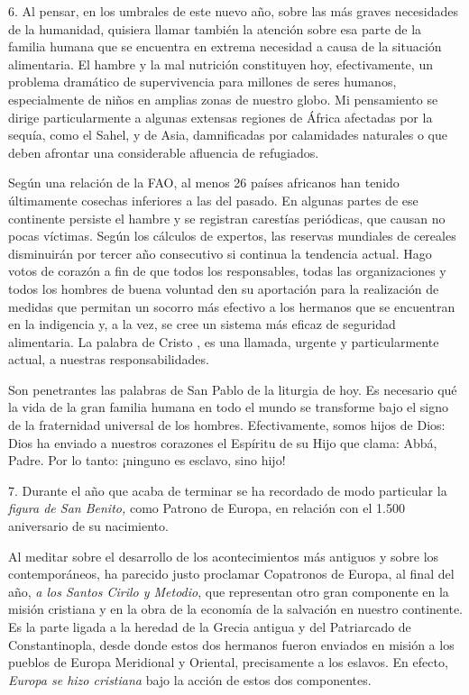 \begin{body}
\begin{body}
6. Al pensar, en los umbrales de este nuevo año, sobre las más graves necesidades de la humanidad, quisiera llamar también la atención sobre esa parte de la familia humana que se encuentra en extrema necesidad a causa de la situación alimentaria. El hambre y la mal nutrición constituyen hoy, efectivamente, un problema dramático de supervivencia para millones de seres humanos, especialmente de niños en amplias zonas de nuestro globo. Mi pensamiento se dirige particularmente a algunas extensas regiones de África afectadas por la sequía, como el Sahel, y de Asia, damnificadas por calamidades naturales o que deben afrontar una considerable afluencia de refugiados.

Según una relación de la FAO, al menos 26 países africanos han tenido últimamente cosechas inferiores a las del pasado. En algunas partes de ese continente persiste el hambre y se registran carestías periódicas, que causan no pocas víctimas. Según los cálculos de expertos, las reservas mundiales de cereales disminuirán por tercer año consecutivo si continua la tendencia actual. Hago votos de corazón a fin de que todos los responsables, todas las organizaciones y todos los hombres de buena voluntad den su aportación para la realización de medidas que permitan un socorro más efectivo a los hermanos que se encuentran en la indigencia y, a la vez, se cree un sistema más eficaz de seguridad alimentaria. La palabra de Cristo , es una llamada, urgente y particularmente actual, a nuestras responsabilidades.

Son penetrantes las palabras de San Pablo de la liturgia de hoy. Es necesario qué la vida de la gran familia humana en todo el mundo se transforme bajo el signo de la fraternidad universal de los hombres. Efectivamente, somos hijos de Dios: Dios ha enviado a nuestros corazones el Espíritu de su Hijo que clama: Abbá, Padre. Por lo tanto: ¡ninguno es esclavo, sino hijo!

7. Durante el año que acaba de terminar se ha recordado de modo particular la \emph{figura de San Benito,} como Patrono de Europa, en relación con el 1.500 aniversario de su nacimiento.

Al meditar sobre el desarrollo de los acontecimientos más antiguos y sobre los contemporáneos, ha parecido justo proclamar Copatronos de Europa, al final del año, \emph{a los Santos Cirilo y Metodio}, que representan otro gran componente en la misión cristiana y en la obra de la economía de la salvación en nuestro continente. Es la parte ligada a la heredad de la Grecia antigua y del Patriarcado de Constantinopla, desde donde estos dos hermanos fueron enviados en misión a los pueblos de Europa Meridional y Oriental, precisamente a los eslavos. En efecto, \emph{Europa se hizo cristiana} bajo la acción de estos dos componentes.


\end{body}
\end{body}
